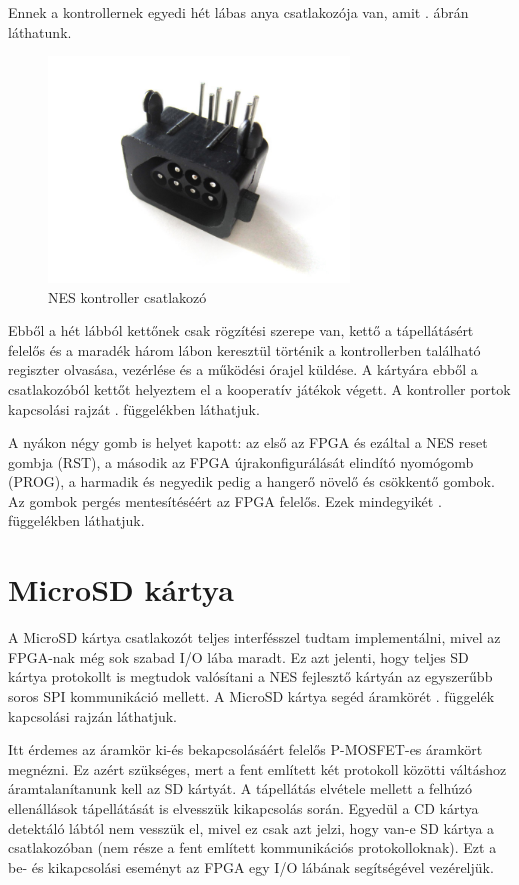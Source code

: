 	Ennek a kontrollernek egyedi hét lábas anya csatlakozója van, amit . ábrán láthatunk.   
	
	\begin{figure}[H]
		\centering
		\includegraphics[width=80mm, keepaspectratio]{figures/7pin-connector} %
		\caption{NES kontroller csatlakozó \cite{NES_controller}}
		\label{fig:7PIN-Port}
	\end{figure}
	
	Ebből a hét lábból kettőnek csak rögzítési szerepe van, kettő a tápellátásért felelős és a maradék három lábon keresztül történik a kontrollerben található regiszter olvasása, vezérlése és a működési órajel küldése. A kártyára ebből a csatlakozóból kettőt helyeztem el a kooperatív játékok végett. A kontroller portok kapcsolási rajzát . függelékben láthatjuk.
	
	A nyákon négy gomb is helyet kapott: az első az FPGA és ezáltal a NES reset gombja (RST), a második az FPGA újrakonfigurálását elindító nyomógomb (PROG), a harmadik és negyedik pedig a hangerő növelő és csökkentő gombok. Az gombok pergés mentesítéséért az FPGA felelős. Ezek mindegyikét . függelékben láthatjuk. 
	
\section{MicroSD kártya}
	
	A MicroSD kártya csatlakozót teljes interfésszel tudtam implementálni, mivel az FPGA-nak még sok szabad I/O lába maradt. Ez azt jelenti, hogy teljes SD kártya protokollt is megtudok valósítani a NES fejlesztő kártyán az egyszerűbb soros SPI kommunikáció mellett. A MicroSD kártya segéd áramkörét . függelék kapcsolási rajzán láthatjuk. 
	
	Itt érdemes az áramkör ki-és bekapcsolásáért felelős P-MOSFET-es áramkört megnézni. Ez azért szükséges, mert a fent említett két protokoll közötti váltáshoz áramtalanítanunk kell az SD kártyát. A tápellátás elvétele mellett a felhúzó ellenállások tápellátását is elvesszük kikapcsolás során. Egyedül a CD kártya detektáló lábtól nem vesszük el, mivel ez csak azt jelzi, hogy van-e SD kártya a csatlakozóban (nem része a fent említett kommunikációs protokolloknak). Ezt a be- és kikapcsolási eseményt az FPGA egy I/O lábának segítségével vezéreljük.
	
